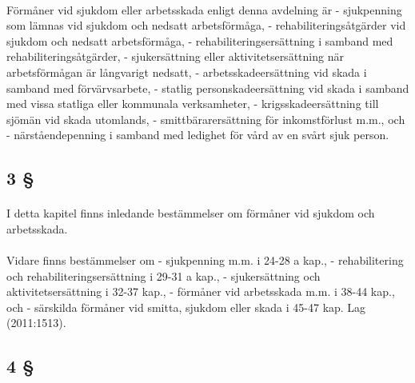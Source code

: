 \documentclass[a4paper,notitlepage,openany,10pt]{book}
\begin{document}
\paragraph*{}
Förmåner vid sjukdom eller arbetsskada enligt denna avdelning är
\newline - sjukpenning som lämnas vid sjukdom och nedsatt arbetsförmåga,
\newline - rehabiliteringsåtgärder vid sjukdom och nedsatt arbetsförmåga,
\newline - rehabiliteringsersättning i samband med rehabiliteringsåtgärder,
\newline - sjukersättning eller aktivitetsersättning när arbetsförmågan är långvarigt nedsatt,
\newline - arbetsskadeersättning vid skada i samband med förvärvsarbete,
\newline - statlig personskadeersättning vid skada i samband med vissa statliga eller kommunala verksamheter,
\newline - krigsskadeersättning till sjömän vid skada utomlands,
\newline - smittbärarersättning för inkomstförlust m.m., och
\newline - närståendepenning i samband med ledighet för vård av en svårt sjuk person.
\subsection*{3 §}
\paragraph*{}
I detta kapitel finns inledande bestämmelser om förmåner vid sjukdom och arbetsskada.
\paragraph*{}
Vidare finns bestämmelser om
\newline - sjukpenning m.m. i 24-28 a kap.,
\newline - rehabilitering och rehabiliteringsersättning i 29-31 a kap.,
\newline - sjukersättning och aktivitetsersättning i 32-37 kap.,
\newline - förmåner vid arbetsskada m.m. i 38-44 kap., och
\newline - särskilda förmåner vid smitta, sjukdom eller skada i 45-47 kap.
Lag (2011:1513).
\subsection*{4 §}
\end{document}
